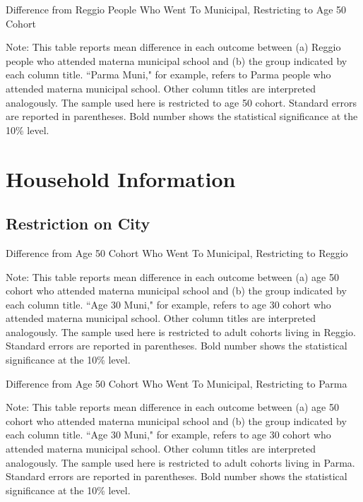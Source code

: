 \documentclass[11pt]{article}
\begin{document}
\begin{table}[H]
\begin{center}
	\caption{Difference from Reggio People Who Went To Municipal, Restricting to Age 50 Cohort}
	\scalebox{0.83}{
		}
\end{center}
\footnotesize
Note: This table reports mean difference in each outcome between (a) Reggio people who attended materna municipal school and (b) the group indicated by each column title. ``Parma Muni," for example, refers to Parma people who attended materna municipal school. Other column titles are interpreted analogously. The sample used here is restricted to age 50 cohort. Standard errors are reported in parentheses. Bold number shows the statistical significance at the 10\% level. 
\end{table}





\section{Household Information}
\subsection{Restriction on City}
\begin{table}[H]
\begin{center}
	\caption{Difference from Age 50 Cohort Who Went To Municipal, Restricting to Reggio}
	\scalebox{0.83}{
		}
\end{center}
\footnotesize
Note: This table reports mean difference in each outcome between (a) age 50 cohort who attended materna municipal school and (b) the group indicated by each column title. ``Age 30 Muni," for example, refers to age 30 cohort who attended materna municipal school. Other column titles are interpreted analogously. The sample used here is restricted to adult cohorts living in Reggio. Standard errors are reported in parentheses. Bold number shows the statistical significance at the 10\% level. 
\end{table}

\begin{table}[H]
\begin{center}
	\caption{Difference from Age 50 Cohort Who Went To Municipal, Restricting to Parma}
	\scalebox{0.83}{
		}
\end{center}
\footnotesize
Note: This table reports mean difference in each outcome between (a) age 50 cohort who attended materna municipal school and (b) the group indicated by each column title. ``Age 30 Muni," for example, refers to age 30 cohort who attended materna municipal school. Other column titles are interpreted analogously. The sample used here is restricted to adult cohorts living in Parma. Standard errors are reported in parentheses. Bold number shows the statistical significance at the 10\% level. 
\end{table}
\end{document}
